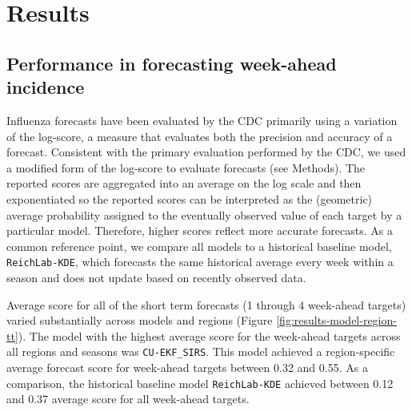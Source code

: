 \documentclass{article}\usepackage[]{graphicx}\usepackage[]{color}
\begin{document}






\section*{Results}


\subsection*{Performance in forecasting week-ahead incidence}

Influenza forecasts have been evaluated by the CDC primarily using a variation of the log-score, a measure that evaluates both the precision and accuracy of a forecast.\cite{Gneiting2007} 
Consistent with the primary evaluation performed by the CDC, we used a modified form of the log-score to evaluate forecasts (see Methods). 
The reported scores are aggregated into an average on the log scale and then exponentiated so the reported scores can be interpreted as the (geometric) average probability assigned to the eventually observed value of each target by a particular model. 
Therefore, higher scores reflect more accurate forecasts. 
As a common reference point, we compare all models to a historical baseline model, {\tt ReichLab-KDE}, which forecasts the same historical average every week within a season and does not update based on recently observed data.



Average score for all of the short term forecasts (1 through 4 week-ahead targets) varied substantially across models and regions (Figure \ref{fig:results-model-region-tt}).
The model with the highest average score for the week-ahead targets across all regions and seasons was {\tt CU-EKF\_SIRS}.
This model achieved a region-specific average forecast score for week-ahead targets between
0.32 
and 
0.55.
As a comparison, the historical baseline model {\tt ReichLab-KDE} achieved between
0.12 and
0.37
average score for all week-ahead targets.
\end{document}
